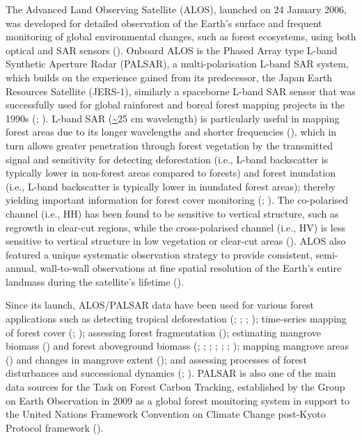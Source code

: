 The Advanced Land Observing Satellite (ALOS), launched on 24 January 2006, was developed for detailed observation of the Earth’s surface and frequent monitoring of global environmental changes, such as forest ecosystems, using both optical and SAR sensors (\cite{shimada_advanced_2010}). Onboard ALOS is the Phased Array type L-band Synthetic Aperture Radar (PALSAR), a multi-polarisation L-band SAR system, which builds on the experience gained from its predecessor, the Japan Earth Resources Satellite (JERS-1), similarly a spaceborne L-band SAR sensor that was successfully used for global rainforest and boreal forest mapping projects in the 1990s (\cite{rosenqvist_global_2000}; \cite{rosenqvist_overview_2004}). L-band SAR (\url{~}25 cm wavelength) is particularly useful in mapping forest areas due to its longer wavelengths and shorter frequencies (\cite{thapa_evaluation_2014}), which in turn allows greater penetration through forest vegetation by the transmitted signal and sensitivity for detecting deforestation (i.e., L-band backscatter is typically lower in non-forest areas compared to forests) and forest inundation (i.e., L-band backscatter is typically lower in inundated forest areas); thereby yielding important information for forest cover monitoring (\cite{shimada_advanced_2010}; \cite{shimada_generating_2010}). The co-polarised channel (i.e., HH) has been found to be sensitive to vertical structure, such as regrowth in clear-cut regions, while the cross-polarised channel (i.e., HV) is less sensitive to vertical structure in low vegetation or clear-cut areas (\cite{shimada_advanced_2010}). ALOS also featured a unique systematic observation strategy to provide consistent, semi-annual, wall-to-wall observations at fine spatial resolution of the Earth's entire landmass during the satellite's lifetime (\cite{rosenqvist_alos_2007}).

Since its launch, ALOS/PALSAR data have been used for various forest applications such as detecting tropical deforestation (\cite{almeidafilho_using_2009}; \cite{rahman_mapping_2010}; \cite{whittle_detection_2012}; \cite{motohka_using_2014}); time-series mapping of forest cover (\cite{thapa_tropical_2013}; \cite{shimada_new_2014}); assessing forest fragmentation (\cite{dong_50-m_2014}); estimating mangrove biomass (\cite{hamdan_l-band_2014}) and forest aboveground biomass (\cite{mitchard_using_2009}; \cite{morel_estimating_2011}; \cite{sarker_potential_2012}; \cite{cartus_mapping_2012}; \cite{rahman_retrieval_2013}; \cite{mermoz_decrease_2015}; \cite{thapa_potential_2015}); mapping mangrove areas (\cite{rocha_de_souza_pereira_mapping_2012}) and changes in mangrove extent (\cite{nascimento_mapping_2013}); and assessing processes of forest disturbances and successional dynamics (\cite{joshi_mapping_2015}; \cite{mermoz_forest_2016}). PALSAR is also one of the main data sources for the Task on Forest Carbon Tracking, established by the Group on Earth Observation in 2009 as a global forest monitoring system in support to the United Nations Framework Convention on Climate Change post-Kyoto Protocol framework (\cite{shimada_advanced_2010}).

